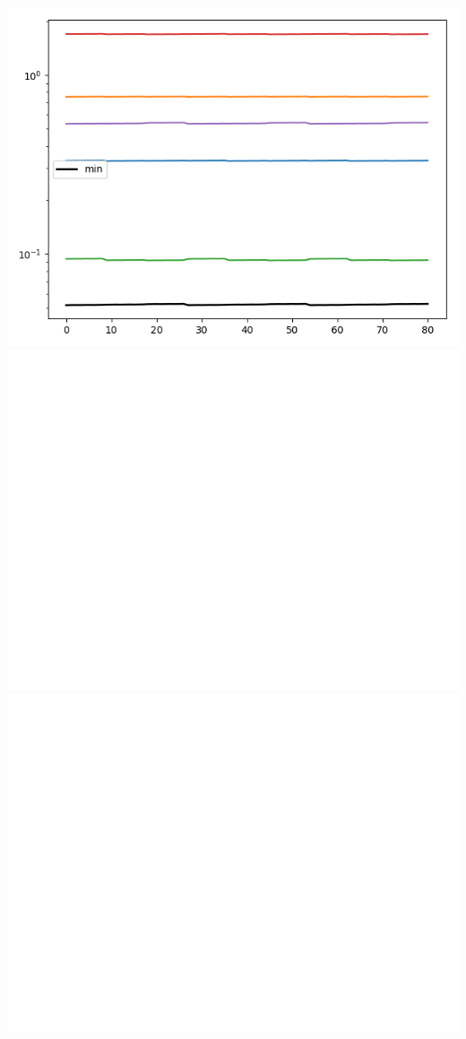 \documentclass{article}
\begin{document}
\begin{center}
\includegraphics[scale=.9]{report_pickled_controls41/control_dpn_all}
\includegraphics[scale=.9]{control_fid_0}
\includegraphics[scale=.9]{off_diag_0}

\end{center}
\end{document}
